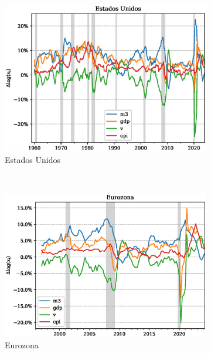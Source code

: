 \documentclass[titlepage, 12pt]{article}
\begin{document}
\begin{figure}
    \centering
    \begin{subfigure}[b]{0.49\textwidth}
        \includegraphics[width=\textwidth]{plots/us-magnitudes.eps}
        \caption{Estados Unidos}
    \end{subfigure}
    ~
    \begin{subfigure}[b]{0.49\textwidth}
        \includegraphics[width=\textwidth]{plots/eu-magnitudes.eps}
        \caption{Eurozona}
    \end{subfigure}
    ~
    \begin{subfigure}[b]{0.49\textwidth}

\end{subfigure}
\end{figure}
\end{document}
